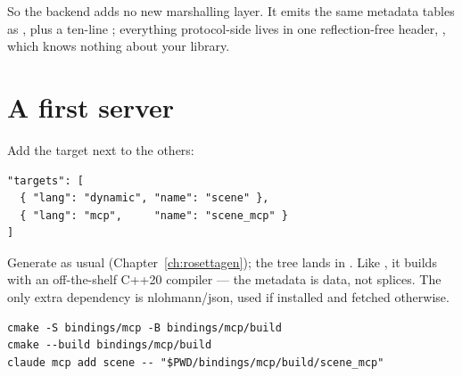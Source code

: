 So the  backend adds no new marshalling layer. It emits the same
metadata tables as , plus a ten-line ; everything
protocol-side lives in one reflection-free header,
, which knows nothing about your library.

\begin{center}
\end{center}

\section{A first server}

Add the target next to the others:

\begin{lstlisting}[style=json]
"targets": [
  { "lang": "dynamic", "name": "scene" },
  { "lang": "mcp",     "name": "scene_mcp" }
]
\end{lstlisting}

Generate as usual (Chapter~\ref{ch:rosettagen}); the tree lands in
. Like , it builds with an off-the-shelf
C++20 compiler --- the metadata is data, not splices. The only extra dependency
is nlohmann/json, used if installed and fetched otherwise.

\begin{lstlisting}[style=sh]
cmake -S bindings/mcp -B bindings/mcp/build
cmake --build bindings/mcp/build
claude mcp add scene -- "$PWD/bindings/mcp/build/scene_mcp"
\end{lstlisting}

